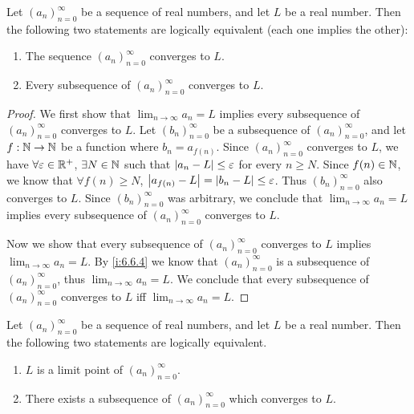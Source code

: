 \begin{prop}\label{i:6.6.5}
  Let \((a_n)_{n = 0}^\infty\) be a sequence of real numbers, and let \(L\) be a real number.
  Then the following two statements are logically equivalent (each one implies the other):
  \begin{enumerate}
    \item The sequence \((a_n)_{n = 0}^\infty\) converges to \(L\).
    \item Every subsequence of \((a_n)_{n = 0}^\infty\) converges to \(L\).
  \end{enumerate}
\end{prop}

\begin{proof}
  We first show that \(\lim_{n \to \infty} a_n = L\) implies every subsequence of \((a_n)_{n = 0}^\infty\) converges to \(L\).
  Let \((b_n)_{n = 0}^\infty\) be a subsequence of \((a_n)_{n = 0}^\infty\), and let \(f : \mathbb{N} \to \mathbb{N}\) be a function where \(b_n = a_{f(n)}\).
  Since \((a_n)_{n = 0}^\infty\) converges to \(L\), we have \(\forall \varepsilon \in \mathbb{R}^+\), \(\exists N \in \mathbb{N}\) such that \(\left\lvert a_n - L\right\rvert \leq \varepsilon\) for every \(n \geq N\).
  Since \(f(n) \in \mathbb{N}\), we know that \(\forall f(n) \geq N\), \(\left\lvert a_{f(n)} - L\right\rvert = \left\lvert b_n - L\right\rvert \leq \varepsilon\).
  Thus \((b_n)_{n = 0}^\infty\) also converges to \(L\).
  Since \((b_n)_{n = 0}^\infty\) was arbitrary, we conclude that \(\lim_{n \to \infty} a_n = L\) implies every subsequence of \((a_n)_{n = 0}^\infty\) converges to \(L\).

  Now we show that every subsequence of \((a_n)_{n = 0}^\infty\) converges to \(L\) implies \(\lim_{n \to \infty} a_n = L\).
  By \cref{i:6.6.4} we know that \((a_n)_{n = 0}^\infty\) is a subsequence of \((a_n)_{n = 0}^\infty\), thus \(\lim_{n \to \infty} a_n = L\).
  We conclude that every subsequence of \((a_n)_{n = 0}^\infty\) converges to \(L\) iff \(\lim_{n \to \infty} a_n = L\).
\end{proof}

\begin{prop}\label{i:6.6.6}
  Let \((a_n)_{n = 0}^\infty\) be a sequence of real numbers, and let \(L\) be a real number.
  Then the following two statements are logically equivalent.
  \begin{enumerate}
    \item \(L\) is a limit point of \((a_n)_{n = 0}^\infty\).
    \item There exists a subsequence of \((a_n)_{n = 0}^\infty\) which converges to \(L\).
  \end{enumerate}
\end{prop}

